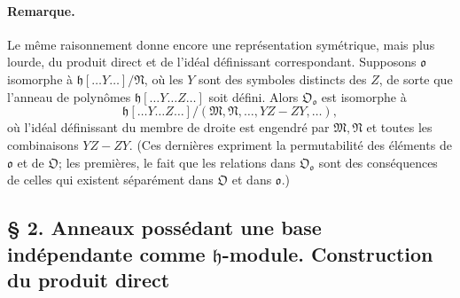 \paragraph{Remarque.}
Le même raisonnement donne encore une représentation symétrique, mais plus lourde, du produit direct et de l'idéal définissant correspondant. Supposons \(\mathfrak o\) isomorphe à \(\mathfrak h[\ldots Y\ldots]/\mathfrak N\), où les \(Y\) sont des symboles distincts des \(Z\), de sorte que l'anneau de polynômes \(\mathfrak h[\ldots Y\ldots Z\ldots]\) soit défini. Alors \(\mathfrak O_{\mathfrak o}\) est isomorphe à
\[
\mathfrak h[\ldots Y\ldots Z\ldots]/(\mathfrak M,\mathfrak N,\ldots,YZ-ZY,\ldots),
\]
où l'idéal définissant du membre de droite est engendré par \(\mathfrak M,\mathfrak N\) et toutes les combinaisons \(YZ-ZY\). (Ces dernières expriment la permutabilité des éléments de \(\mathfrak o\) et de \(\mathfrak O\); les premières, le fait que les relations dans \(\mathfrak O_{\mathfrak o}\) sont des conséquences de celles qui existent séparément dans \(\mathfrak O\) et dans \(\mathfrak o\).)

\subsection*{\S{} 2. Anneaux possédant une base indépendante comme $\mathfrak h$-module. Construction du produit direct}

